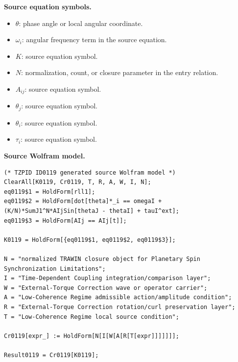 \begin{minipage}[t]{0.49\linewidth}
\begingroup
\small
\raggedright
\textbf{Source equation symbols.}\par
\begin{itemize}[leftmargin=1.35em,itemsep=1pt,topsep=1pt,parsep=0pt]
    \item $\theta$: phase angle or local angular coordinate.
    \item $\omega_i$: angular frequency term in the source equation.
    \item $K$: source equation symbol.
    \item $N$: normalization, count, or closure parameter in the entry relation.
    \item $A_{ij}$: source equation symbol.
    \item $\theta_j$: source equation symbol.
    \item $\theta_i$: source equation symbol.
    \item $\tau_i$: source equation symbol.
\end{itemize}
\endgroup
\end{minipage}\hfill
\begin{minipage}[t]{0.47\linewidth}
\begingroup
\scriptsize
\raggedright
\textbf{Source Wolfram model.}\par
\begin{Verbatim}[fontsize=\tiny,breaklines=true,breakanywhere=true]
(* TZPID ID0119 generated source Wolfram model *)
ClearAll[K0119, Cr0119, T, R, A, W, I, N];
eq0119$1 = HoldForm[rll1];
eq0119$2 = HoldForm[dot[theta]*_i == omegaI + (K/N)*SumJ1^N*AIjSin[thetaJ - thetaI] + tauI^ext];
eq0119$3 = HoldForm[AIj == AIj[t]];

K0119 = HoldForm[{eq0119$1, eq0119$2, eq0119$3}];

N = "normalized TRAWIN closure object for Planetary Spin Synchronization Limitations";
I = "Time-Dependent Coupling integration/comparison layer";
W = "External-Torque Correction wave or operator carrier";
A = "Low-Coherence Regime admissible action/amplitude condition";
R = "External-Torque Correction rotation/curl preservation layer";
T = "Low-Coherence Regime local source condition";

Cr0119[expr_] := HoldForm[N[I[W[A[R[T[expr]]]]]]];

Result0119 = Cr0119[K0119];
\end{Verbatim}
\endgroup
\end{minipage}

